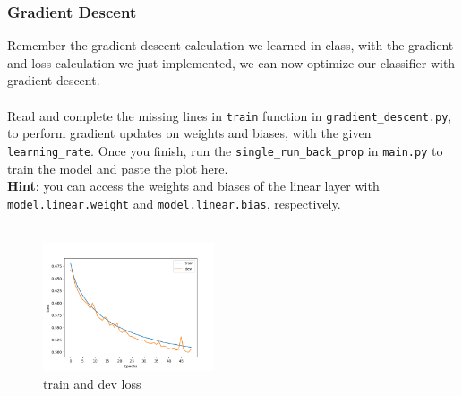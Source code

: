 \subsubsection{Gradient Descent}
Remember the gradient descent calculation we learned in class, with the gradient and loss calculation we just implemented, we can now optimize our classifier with gradient descent.\\\\
\noindent \todo{} Read and complete the missing lines in \texttt{train} function in \texttt{gradient\_descent.py}, to perform gradient updates on weights and biases, with the given \texttt{learning\_rate}. Once you finish, run the \texttt{single\_run\_back\_prop} in \texttt{main.py} to train the model and paste the plot here.
\\
\noindent \textbf{Hint}: you can access the weights and biases of the linear layer with \texttt{model.linear.weight} and \texttt{model.linear.bias}, respectively.\\
\noindent {\color{red}{your plot:}}\\
\begin{figure}[h]
   \centering
   \includegraphics[width=0.45\textwidth]{gradient_descent_loss.png}
   \caption{train and dev loss}
\end{figure}\\





